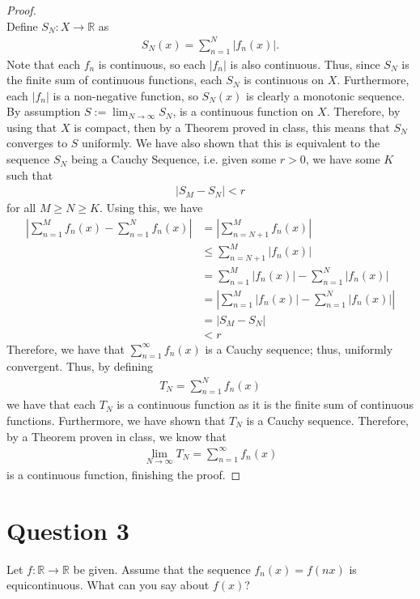 \documentclass[10pt,a4paper]{article}
\theoremstyle{definition}
\theoremstyle{definition}
\numberwithin{equation}{section}
\begin{document}
\begin{proof}$ $
\\Define $S_N: X \to \mathbb{R}$ as 
\begin{align*}
S_N(x) = \sum_{n = 1}^N |f_n(x)|.
\end{align*}
Note that each $f_n$ is continuous, so each $|f_n|$ is also continuous. Thus, since $S_N$ is the finite sum of continuous functions, each $S_N$ is continuous on $X$. Furthermore, each $|f_n|$ is a non-negative function, so $S_N(x)$ is clearly a monotonic sequence. By assumption $S := \lim_{N \to \infty} S_N$, is a continuous function on $X$. Therefore, by using that $X$ is compact, then by a Theorem proved in class, this means that $S_N$ converges to $S$ uniformly. We have also shown that this is equivalent to the sequence $S_N$ being a Cauchy Sequence, i.e. given some $r > 0$, we have some $K$ such that 
\begin{align*}
|S_M - S_N| < r
\end{align*}
for all $M \geq N \geq K$. Using this, we have
\begin{align*}
\left| \sum_{n = 1}^M f_n(x) - \sum_{n = 1}^N f_n(x) \right| &= \left| \sum_{n = N + 1}^M f_n(x) \right|\\
&\leq \sum_{n = N + 1}^M |f_n(x)|\\
&= \sum_{n = 1}^M |f_n(x)| - \sum_{n = 1}^N |f_n(x)|\\
&= \left| \sum_{n = 1}^M |f_n(x)| - \sum_{n = 1}^N |f_n(x)| \right|\\
&= |S_M - S_N|\\
&< r
\end{align*}
Therefore, we have that $\sum_{n = 1}^\infty f_n(x)$ is a Cauchy sequence; thus, uniformly convergent. Thus, by defining 
\begin{align*}
T_N = \sum_{n = 1}^N f_n(x)
\end{align*}
we have that each $T_N$ is a continuous function as it is the finite sum of continuous functions. Furthermore, we have shown that $T_N$ is a Cauchy sequence. Therefore, by a Theorem proven in class, we know that
\begin{align*}
\lim_{N \to \infty} T_N = \sum_{n = 1}^\infty f_n(x)
\end{align*}
is a continuous function, finishing the proof. 
\end{proof}

\section*{Question 3}
Let $f: \mathbb{R} \to \mathbb{R}$ be given. Assume that the sequence $f_n(x) = f(nx)$ is equicontinuous. What can you say about $f(x)$?
\end{document}
